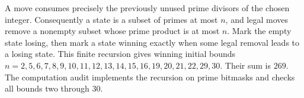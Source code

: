 A move consumes precisely the previously unused prime divisors of the chosen integer. Consequently a state is a subset of primes at most $n$, and legal moves remove a nonempty subset whose prime product is at most $n$. Mark the empty state losing, then mark a state winning exactly when some legal removal leads to a losing state. This finite recursion gives winning initial bounds $n=2,5,6,7,8,9,10,11,12,13,14,15,16,19,20,21,22,29,30$. Their sum is $\boxed{269}$. The computation audit implements the recursion on prime bitmasks and checks all bounds two through 30.
